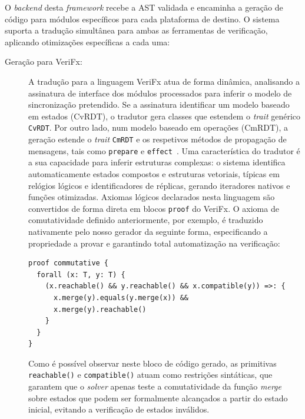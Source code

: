 \documentclass{llncs}
\begin{document}
O \textit{backend} desta \textit{framework} recebe a AST validada e encaminha a geração de código para módulos específicos para
cada plataforma de destino. O sistema suporta a tradução simultânea para ambas as ferramentas de verificação,
aplicando otimizações específicas a cada uma:

\begin{description}
\item[Geração para VeriFx:] A tradução para a linguagem VeriFx atua de forma dinâmica,
analisando a assinatura de interface dos módulos processados para inferir o modelo de sincronização pretendido.
Se a assinatura identificar um modelo baseado em estados (CvRDT), o tradutor gera classes que estendem o \textit{trait} genérico \texttt{CvRDT}.
Por outro lado, num modelo baseado em operações (CmRDT), a geração estende o \textit{trait} \texttt{CmRDT} e os respetivos métodos de propagação de mensagens,
tais como \texttt{prepare} e \texttt{effect}~\cite{shapiro2011comprehensive}. Uma característica do tradutor é a sua capacidade para inferir estruturas complexas:
o sistema identifica automaticamente estados compostos e estruturas vetoriais,
típicas em relógios lógicos e identificadores de réplicas, gerando iteradores nativos e funções otimizadas.
Axiomas lógicos declarados nesta linguagem são convertidos de forma direta em blocos \texttt{proof} do VeriFx.
O axioma de comutatividade definido anteriormente, por exemplo, é traduzido nativamente pelo nosso gerador da seguinte forma,
especificando a propriedade a provar e garantindo total automatização na verificação:

\begin{verbatim}
proof commutative {
  forall (x: T, y: T) {
    (x.reachable() && y.reachable() && x.compatible(y)) =>: {
      x.merge(y).equals(y.merge(x)) &&
      x.merge(y).reachable()
    }
  }
}
\end{verbatim}

Como é possível observar neste bloco de código gerado, as primitivas \texttt{reachable()}
e \texttt{compatible()} atuam como restrições sintáticas, que garantem que o \textit{solver}
apenas teste a comutatividade da função \textit{merge} sobre estados que podem ser formalmente
alcançados a partir do estado inicial, evitando a verificação de estados inválidos.


\end{description}
\end{document}

